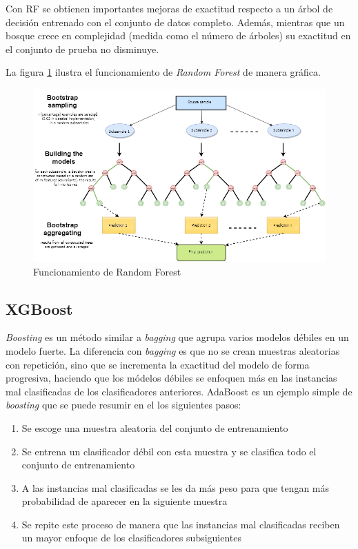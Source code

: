Con \ac{RF} se obtienen importantes mejoras de exactitud respecto a un árbol de decisión entrenado con el conjunto de datos completo. Además, mientras que un bosque crece en complejidad (medida como el número de árboles) su exactitud en el conjunto de prueba no disminuye.

La figura \ref{fig:rf} ilustra el funcionamiento de \textit{Random Forest} de manera gráfica.

\begin{figure}[htbp]
	\centering
	\includegraphics[width=\linewidth]{graficos/rf.png}
	\caption{Funcionamiento de Random Forest \citep{mql5:rf}}
	\label{fig:rf}
\end{figure}


\subsection{XGBoost}

\textit{Boosting} es un método similar a \textit{bagging} que agrupa varios modelos débiles en un modelo fuerte. La diferencia con \textit{bagging} es que no se crean muestras aleatorias con repetición, sino que se incrementa la exactitud del modelo de forma progresiva, haciendo que los módelos débiles se enfoquen más en las instancias mal clasificadas de los clasificadores anteriores. AdaBoost es un ejemplo simple de \textit{boosting} que se puede resumir en el los siguientes pasos:

\begin{enumerate}
	\item Se escoge una muestra aleatoria del conjunto de entrenamiento
	\item Se entrena un clasificador débil con esta muestra y se clasifica todo el conjunto de entrenamiento
	\item A las instancias mal clasificadas se les da más peso para que tengan más probabilidad de aparecer en la siguiente muestra
	\item Se repite este proceso de manera que las instancias mal clasificadas reciben un mayor enfoque de los clasificadores subsiguientes
\end{enumerate}

